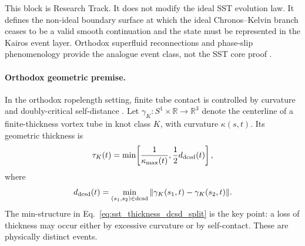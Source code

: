 This block is Research Track. It does not modify the ideal SST evolution law. It defines the non-ideal boundary surface at which the ideal Chronos--Kelvin branch ceases to be a valid smooth continuation and the state must be represented in the Kairos event layer. Orthodox superfluid reconnections and phase-slip phenomenology provide the analogue event class, not the SST core proof \cite{KoplikLevine1993,BewleyPaolettiSreenivasanLathrop2008,Varoquaux2015AndersonPhaseSlippage,Kleckner2016SuperfluidKnotsUntie}.

\paragraph{Orthodox geometric premise.}
In the orthodox ropelength setting, finite tube contact is controlled by curvature and doubly-critical self-distance \cite{CantarellaKusnerSullivan2002,AshtonCantarellaPiatekRawdon2011}. Let $\gamma_K:S^1\times\mathbb R\to\mathbb R^3$ denote the centerline of a finite-thickness vortex tube in knot class $K$, with curvature $\kappa(s,t)$. Its geometric thickness is
\begin{equation}
    \tau_K(t)
    =
    \min\!\left[
        \frac{1}{\kappa_{\max}(t)},
        \frac{1}{2}d_{\rm dcsd}(t)
    \right],
    \label{eq:sst_thickness_dcsd_split}
\end{equation}
where
\begin{equation}
    d_{\rm dcsd}(t)
    =
    \min_{(s_1,s_2)\in {\rm dcsd}}
    \|\gamma_K(s_1,t)-\gamma_K(s_2,t)\|.
    \label{eq:sst_dcsd_definition}
\end{equation}
The min-structure in Eq.~\eqref{eq:sst_thickness_dcsd_split} is the key point: a loss of thickness may occur either by excessive curvature or by self-contact. These are physically distinct events.


